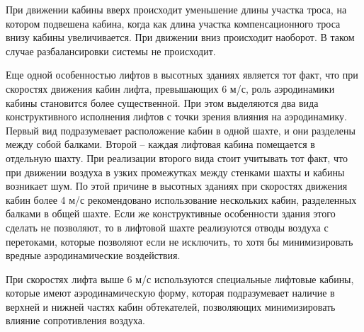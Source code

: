 		При движении кабины вверх происходит уменьшение длины участка троса, на котором подвешена кабина,
			когда как длина участка компенсационного троса внизу кабины увеличивается.
			При движении вниз происходит наоборот. В таком случае разбалансировки системы не происходит. 

		Еще одной особенностью лифтов в высотных зданиях является тот факт,
			что при скоростях движения кабин лифта, превышающих 6 м/с, роль аэродинамики кабины становится
			более существенной. При этом выделяются два вида конструктивного исполнения лифтов с точки зрения
			влияния на аэродинамику. Первый вид подразумевает расположение кабин в одной шахте,
			и они разделены между собой балками. Второй – каждая лифтовая кабина помещается в отдельную шахту.
			При реализации второго вида стоит учитывать тот факт, что при движении воздуха в узких промежутках
			между стенками шахты и кабины возникает шум. По этой причине в высотных зданиях
			при скоростях движения кабин более 4 м/с рекомендовано использование нескольких кабин,
			разделенных балками в общей шахте. Если же конструктивные особенности здания этого сделать не позволяют,
			то в лифтовой шахте реализуются отводы воздуха с перетоками, которые позволяют если не исключить,
			то хотя бы минимизировать вредные аэродинамические воздействия.

		При скоростях лифта выше 6 м/с используются специальные лифтовые кабины,
			которые имеют аэродинамическую форму, которая подразумевает наличие в верхней
			и нижней частях кабин обтекателей, позволяющих минимизировать влияние сопротивления воздуха. 
